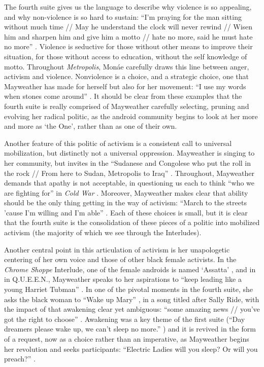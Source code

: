 \documentclass[a4paper, 11pt]{article} %
\begin{document}
The fourth suite gives us the language to describe why violence is so appealing, and why non-violence is so hard to sustain:
``I'm praying for the man sitting without much time // May he understand the clock will never rewind // Wisen him and sharpen him and give him a motto // hate no more, said he must hate no more'' \cite{danceordie}.
Violence is seductive for those without other means to improve their situation, for those without access to education, without the self knowledge of motto.
Throughout \emph{Metropolis}, Mon\'ae carefully draws this line between anger, activism and violence.
Nonviolence is a choice, and a strategic choice, one that Mayweather has made for herself  but also for her movement: ``I use my words when stones come around'' \cite{manymoons}.
It should be clear from these examples that the fourth suite is really comprised of Mayweather carefully selecting, pruning and evolving her radical politic, as the android community begins to look at her more and more as `the One', rather than as one of their own.

Another feature of this politic of activism is a consistent call to universal mobilization, but distinctly not a universal oppression.
Mayweather is singing to her community, but invites in the 
``Sudanese and Congolese who put the roll in the rock // From here to Sudan, Metropolis to Iraq'' \cite{danceordie}.
Throughout, Mayweather demands that apathy is not acceptable, in questioning us each to think ``who we are fighting for'' in \emph{Cold War} \cite{coldwar}.
Moreover, Mayweather makes clear that ability should be the only thing getting in the way of activism: 
``March to the streets 'cause I'm willing and I'm able'' \cite{queen}.
Each of these choices is small, but it is clear that the fourth suite is the consolidation of these pieces of a politic into mobilized activism (the majority of which we see through the Interludes).

Another central point in this articulation of activism is her unapologetic centering of her own voice and those of other black female activists.
In the \emph{Chrome Shoppe} Interlude, one of the female androids is named `Assatta' \cite{chromeshoppe}, and in in Q.U.E.E.N., Mayweather speaks to her aspirations to ``keep leading like a young Harriet Tubman'' \cite{queen}.
In one of the pivotal moments in the fourth suite, she asks the black woman to ``Wake up Mary'' \cite{sallyride}, in a song titled after Sally Ride, with the impact of that awakening clear yet ambiguous: ``some amazing news // you've got the right to choose'' \cite{sallyride}. 
Awakening was a key theme of the first suite (``Day dreamers please wake up, we can't sleep no more.'' \cite{sincerelyjane}) and it is revived in the form of a request, now as a choice rather than an imperative, as Mayweather begins her revolution and seeks participants: ``Electric Ladies will you sleep? Or will you preach?'' \cite{queen}.
\end{document}
